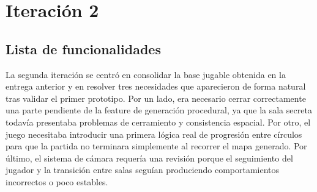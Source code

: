 \chapter{Iteración 2}

\begin{abstract}
Esta iteración consolida el primer prototipo funcional y corrige carencias detectadas en
la entrega inicial. El trabajo se centra en completar aspectos pendientes de la generación
procedural, introducir la progresión entre círculos y estabilizar el sistema de cámara
por salas.
\end{abstract}

\section{Lista de funcionalidades}
La segunda iteración se centró en consolidar la base jugable obtenida en la entrega
anterior y en resolver tres necesidades que aparecieron de forma natural tras validar el
primer prototipo. Por un lado, era necesario cerrar correctamente una parte pendiente de la
feature de generación procedural, ya que la sala secreta todavía presentaba problemas de
cerramiento y consistencia espacial. Por otro, el juego necesitaba introducir una primera
lógica real de progresión entre círculos para que la partida no terminara simplemente al
recorrer el mapa generado. Por último, el sistema de cámara requería una revisión porque el
seguimiento del jugador y la transición entre salas seguían produciendo comportamientos
incorrectos o poco estables.

